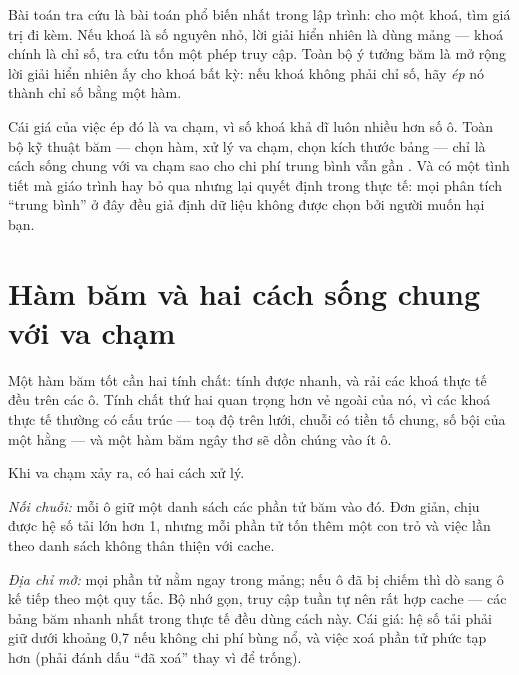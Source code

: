 \documentclass[../../algorithm.tex]{subfiles}
\begin{document}
Bài toán tra cứu là bài toán phổ biến nhất trong lập trình: cho một khoá, tìm giá trị đi kèm. Nếu khoá là số nguyên nhỏ, lời giải hiển nhiên là dùng mảng --- khoá chính là chỉ số, tra cứu tốn một phép truy cập. Toàn bộ ý tưởng băm là mở rộng lời giải hiển nhiên ấy cho khoá bất kỳ: nếu khoá không phải chỉ số, hãy \emph{ép} nó thành chỉ số bằng một hàm.

Cái giá của việc ép đó là va chạm, vì số khoá khả dĩ luôn nhiều hơn số ô. Toàn bộ kỹ thuật băm --- chọn hàm, xử lý va chạm, chọn kích thước bảng --- chỉ là cách sống chung với va chạm sao cho chi phí trung bình vẫn gần . Và có một tình tiết mà giáo trình hay bỏ qua nhưng lại quyết định trong thực tế: mọi phân tích ``trung bình'' ở đây đều giả định dữ liệu không được chọn bởi người muốn hại bạn.

\section{Hàm băm và hai cách sống chung với va chạm}

Một hàm băm tốt cần hai tính chất: tính được nhanh, và rải các khoá thực tế đều trên các ô. Tính chất thứ hai quan trọng hơn vẻ ngoài của nó, vì các khoá thực tế thường có cấu trúc --- toạ độ trên lưới, chuỗi có tiền tố chung, số bội của một hằng --- và một hàm băm ngây thơ sẽ dồn chúng vào ít ô.

Khi va chạm xảy ra, có hai cách xử lý.

\emph{Nối chuỗi:} mỗi ô giữ một danh sách các phần tử băm vào đó. Đơn giản, chịu được hệ số tải lớn hơn 1, nhưng mỗi phần tử tốn thêm một con trỏ và việc lần theo danh sách không thân thiện với cache.

\emph{Địa chỉ mở:} mọi phần tử nằm ngay trong mảng; nếu ô đã bị chiếm thì dò sang ô kế tiếp theo một quy tắc. Bộ nhớ gọn, truy cập tuần tự nên rất hợp cache --- các bảng băm nhanh nhất trong thực tế đều dùng cách này. Cái giá: hệ số tải phải giữ dưới khoảng 0,7 nếu không chi phí bùng nổ, và việc xoá phần tử phức tạp hơn (phải đánh dấu ``đã xoá'' thay vì để trống).
\end{document}

